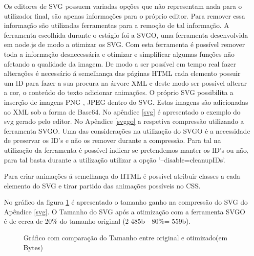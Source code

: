 \par Os editores de SVG possuem variadas opções que não representam nada para o utilizador final, são apenas informações para o próprio editor. Para remover essa informação são utilizadas ferramentas para a remoção de tal informação. A ferramenta escolhida durante o estágio foi a SVGO\cite{svgo}, uma ferramenta desenvolvida em node.js de modo a otimizar os SVG. Com esta ferramenta é possível remover toda a informação desnecessária e otimizar e simplificar algumas funções não afetando a qualidade da imagem. De modo a ser possível em tempo real fazer alterações é necessário á semelhança das páginas HTML cada elemento possuir um ID para fazer a sua procura na árvore XML e deste modo ser possível alterar a cor, o conteúdo do texto adicionar animações. O próprio SVG possibilita a inserção de imagens PNG , JPEG dentro do SVG. Estas imagens são adicionadas ao XML sob a forma de Base64.  No apêndice \ref{svg} é apresentado o exemplo do svg gerado pelo editor. No Apêndice \ref{svggo} a respetiva compressão utilizando a ferramenta SVGO. Uma das considerações na utilização do SVGO é a necessidade de preservar os ID's e não os remover durante a compressão. Para tal na utilização da ferramenta é possível indicar se pretendemos manter os ID's ou não, para tal basta durante a utilização utilizar a opção '--disable=cleanupIDs'.

\par Para criar animações á semelhança do HTML é possível atribuir classes a cada elemento do SVG e tirar partido das animações possíveis no CSS. 
\par No gráfico da figura \ref{compSV} é apresentado o tamanho ganho na compressão do SVG do Apêndice \ref{svg}. O Tamanho do SVG após a otimização com a ferramenta SVGO é de cerca de 20\% do tamanho original (2 485b - 80\%= 559b).

\begin{figure}[ht]
\centering
{}

\caption{Gráfico com comparação do Tamanho entre original e otimizado(em Bytes)}\label{compSV}


\end{figure}

